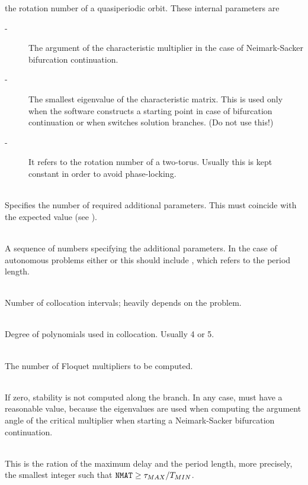 \documentclass[10pt,a4paper]{ddedoc}
\begin{document}
\begin{description}
the rotation number of a quasiperiodic orbit.
These  internal parameters are
\begin{description}
\item[ -] The argument of the characteristic multiplier in the case of Neimark-Sacker bifurcation continuation. 
\item[ -] The smallest eigenvalue of the characteristic matrix. This is used only when the software constructs a starting point in case of bifurcation continuation or when switches solution branches. (Do not use this!)
\item[ -] It refers to the rotation number of a two-torus. Usually this is kept constant in order to avoid phase-locking.
\end{description}
%
\item[\funp{NPARX}] ~\\
Specifies the number of required additional parameters. This must coincide with the expected value (see ).
%
\item[\funp{PARX}] ~\\
A sequence of numbers specifying the additional parameters. In
the case of autonomous problems either  or this should include , which refers to the period length.
%
\item[\funp{NINT}] ~\\
Number of collocation intervals; heavily depends on the problem.
%
\item[\funp{NDEG}] ~\\
Degree of polynomials used in collocation. Usually 4 or 5.
%
\item[\funp{NMUL}] ~\\
The number of Floquet multipliers to be computed.
%
\item[\funp{STAB}] ~\\
If zero, stability is not computed along the branch. In any case,  must have a reasonable value, because the eigenvalues are used when computing the argument angle of the critical multiplier when starting a Neimark-Sacker bifurcation continuation.
%
\item[\funp{NMAT}] ~\\
This is the ration of the maximum delay and the period length, more precisely, the smallest integer such that ${\tt NMAT} \ge \tau_{MAX}/T_{MIN}$.

\end{description}
\end{document}
